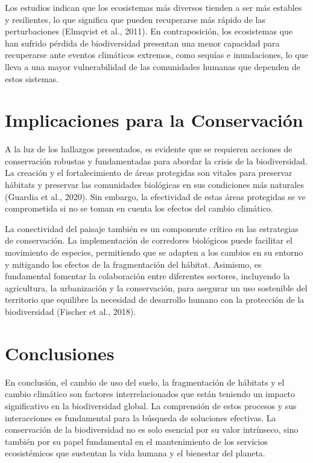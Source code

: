 \documentclass[
  letterpaper,
  DIV=11,
  numbers=noendperiod,
  oneside]{scrreprt}
\begin{document}
Los estudios indican que los ecosistemas más diversos tienden a ser más
estables y resilientes, lo que significa que pueden recuperarse más
rápido de las perturbaciones (Elmqvist et al., 2011). En contraposición,
los ecosistemas que han sufrido pérdida de biodiversidad presentan una
menor capacidad para recuperarse ante eventos climáticos extremos, como
sequías e inundaciones, lo que lleva a una mayor vulnerabilidad de las
comunidades humanas que dependen de estos sistemas.

\section{Implicaciones para la
Conservación}\label{implicaciones-para-la-conservaciuxf3n-3}

A la luz de los hallazgos presentados, es evidente que se requieren
acciones de conservación robustas y fundamentadas para abordar la crisis
de la biodiversidad. La creación y el fortalecimiento de áreas
protegidas son vitales para preservar hábitats y preservar las
comunidades biológicas en sus condiciones más naturales (Guardia et al.,
2020). Sin embargo, la efectividad de estas áreas protegidas se ve
comprometida si no se toman en cuenta los efectos del cambio climático.

La conectividad del paisaje también es un componente crítico en las
estrategias de conservación. La implementación de corredores biológicos
puede facilitar el movimiento de especies, permitiendo que se adapten a
los cambios en su entorno y mitigando los efectos de la fragmentación
del hábitat. Asimismo, es fundamental fomentar la colaboración entre
diferentes sectores, incluyendo la agricultura, la urbanización y la
conservación, para asegurar un uso sostenible del territorio que
equilibre la necesidad de desarrollo humano con la protección de la
biodiversidad (Fischer et al., 2018).

\section{Conclusiones}\label{conclusiones-5}

En conclusión, el cambio de uso del suelo, la fragmentación de hábitats
y el cambio climático son factores interrelacionados que están teniendo
un impacto significativo en la biodiversidad global. La comprensión de
estos procesos y sus interacciones es fundamental para la búsqueda de
soluciones efectivas. La conservación de la biodiversidad no es solo
esencial por su valor intrínseco, sino también por su papel fundamental
en el mantenimiento de los servicios ecosistémicos que sustentan la vida
humana y el bienestar del planeta.
\end{document}
